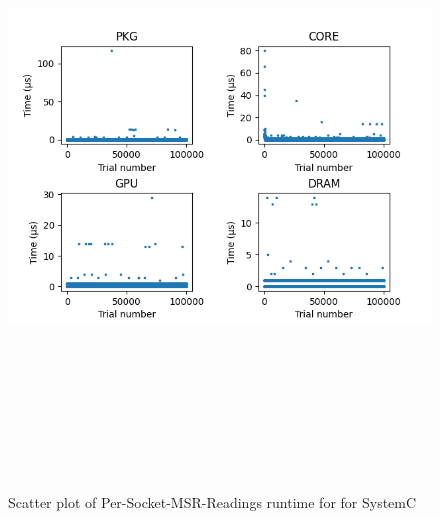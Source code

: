 \documentclass{article}
\begin{document}
    \begin{figure}[H]
    	\centering
    	\includegraphics[width=17cm,height=17cm,keepaspectratio]{RuntimeResults_SystemC/PerSocketMSRReadings/Socket1/scatters.png}
    	\caption{Scatter plot of Per-Socket-MSR-Readings runtime for  for SystemC}
    	\label{fig:Per-Socket-MSR-Readings||SystemC}
    \end{figure}
\end{document}
